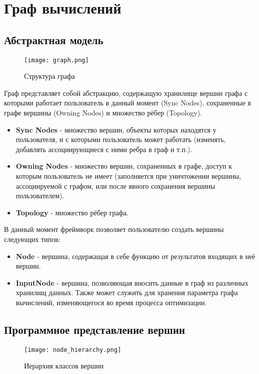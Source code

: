 \clearpage

\section{Граф вычислений}
\subsection{Абстрактная модель}
\label{sec:abstractmodel}
\begin{figure}[ht]
    \centering
    \texttt{[image: graph.png]}
    \caption{Структура графа}
    \label{fig:graphstructure}
\end{figure}
Граф представляет собой абстракцию, содержащую хранилище вершин графа с которыми работает пользователь в данный момент (Sync Nodes), сохраненные в графе вершины (Owning Nodes) и множество рёбер (Topology).
\begin{itemize}
    \item \textbf{Sync Nodes} - множество вершин, объекты которых находятся у пользователя, и с которыми пользователь может работать (изменять, добавлять ассоциирующиеся с ними ребра в граф и т.п.).
    \item \textbf{Owning Nodes} - множество вершин, сохраненных в графе, доступ к которым пользователь не имеет (заполняется при уничтожении вершины, ассоциируемой с графом, или после явного сохранения вершины пользователем).
    \item \textbf{Topology} - множество рёбер графа.
\end{itemize}
В данный момент фреймворк позволяет пользователю создать вершины следующих типов:
\begin{itemize}
	\item \textbf{Node} - вершина, содержащая в себе функцию от результатов входящих в неё вершин.
	\item \textbf{InputNode} - вершина, позволяющая вносить данные в граф из различных хранилищ данных. Также может служить для хранения параметра графа вычислений, изменяющегося во время процесса оптимизации. 
\end{itemize}
\subsection{Программное представление вершин}
\label{sec:softwarepresentationnodes}
\begin{figure}[ht]
    \centering
    \texttt{[image: node\_hierarchy.png]}
    \caption{Иерархия классов вершин}
    \label{fig:nodes_hierarchy}
\end{figure}


